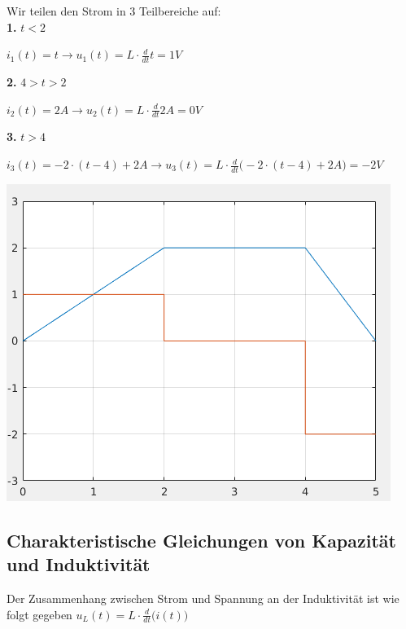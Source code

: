 \iend


\newpage


\beginbsp
Wir teilen den Strom in 3 Teilbereiche auf: \\
\textbf{1.} $t < 2$
\begin{center}

    $ i_1(t) = t \rightarrow u_1(t) = L \cdot \frac{d}{dt} t = 1V $
\end{center}
  \textbf{2.} $ 4 > t > 2$
  \begin{center}

      $ i_2(t) = 2A \rightarrow u_2(t) = L \cdot \frac{d}{dt} 2 A = 0V$
  \end{center}

    \textbf{3.} $t > 4$
    \begin{center}

        $ i_3(t) = -2 \cdot (t-4) + 2A \rightarrow u_3(t) = L \cdot \frac{d}{dt} \big( -2 \cdot (t-4) + 2A \big) = -2 V$
    \end{center}
\begin{center}
  \includegraphics[scale=0.5]{img/selbstind-a1-lsg}
\end{center}
\iend



\newpage


\subsection{Charakteristische Gleichungen von Kapazität und Induktivität}
\begingl
Der Zusammenhang zwischen Strom und Spannung an der Induktivität ist wie folgt gegeben
\formulaBegin
$\displaystyle u_L(t) = L \cdot \frac{d}{dt}\big( i(t) \big)$

